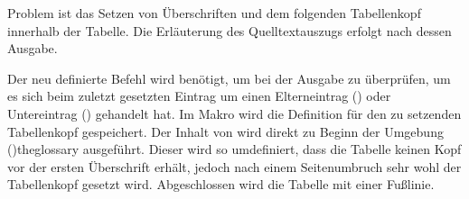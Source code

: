 \documentclass[%
  english,ngerman,%
  cdgeometry=no,DIV=12,%
  cd=false,cdfont=false,cdtitle=true,%
  headings=normal,%
  automark,%
  listof=toc,%
]{tudscrartcl}
\begin{document}
Problem ist das Setzen von Überschriften und dem folgenden Tabellenkopf 
innerhalb der Tabelle. Die Erläuterung des Quelltextauszugs erfolgt nach dessen 
Ausgabe.
%
\CodeHook{\let\newglossarystyle\renewglossarystyle}
\begin{Hint*}
\end{Hint*}
%
Der neu definierte Befehl  wird benötigt, um bei der 
Ausgabe zu überprüfen, um es sich beim zuletzt gesetzten Eintrag um einen 
Elterneintrag () oder Untereintrag () 
gehandelt hat. Im Makro  wird die Definition für den zu 
setzenden Tabellenkopf gespeichert. Der Inhalt von  wird 
direkt zu Beginn der Umgebung \Environment(){theglossary} 
ausgeführt. Dieser wird so umdefiniert, dass die Tabelle keinen Kopf vor der 
ersten Überschrift erhält, jedoch nach einem Seitenumbruch sehr wohl der 
Tabellenkopf gesetzt wird. Abgeschlossen wird die Tabelle mit einer Fußlinie.
\end{document}
